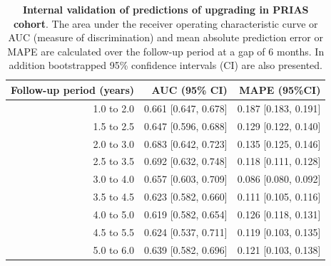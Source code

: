 \begin{subappendices}
\begin{table}
\small
\centering
\caption{\textbf{Internal validation of predictions of upgrading in PRIAS cohort}. The area under the receiver operating characteristic curve or AUC (measure of discrimination) and mean absolute prediction error or MAPE are calculated over the follow-up period at a gap of 6 months. In addition bootstrapped 95\% confidence intervals (CI) are also presented.}
\label{c5:tab:AUC_PE_PRIAS}
\begin{tabular}{r|r|r}
\hline
\hline
Follow-up period (years) & AUC (95\% CI) & MAPE (95\%CI)\\ 
\hline
1.0 to 2.0 & 0.661 [0.647, 0.678] & 0.187 [0.183, 0.191]\\
1.5 to 2.5 & 0.647 [0.596, 0.688] & 0.129 [0.122, 0.140]\\
2.0 to 3.0 & 0.683 [0.642, 0.723] & 0.135 [0.125, 0.146]\\
2.5 to 3.5 & 0.692 [0.632, 0.748] & 0.118 [0.111, 0.128]\\
3.0 to 4.0 & 0.657 [0.603, 0.709] & 0.086 [0.080, 0.092]\\
3.5 to 4.5 & 0.623 [0.582, 0.660] & 0.111 [0.105, 0.116]\\
4.0 to 5.0 & 0.619 [0.582, 0.654] & 0.126 [0.118, 0.131]\\
4.5 to 5.5 & 0.624 [0.537, 0.711] & 0.119 [0.103, 0.135]\\
5.0 to 6.0 & 0.639 [0.582, 0.696] & 0.121 [0.103, 0.138]\\
\hline
\end{tabular}    
\end{table}


\end{subappendices}
